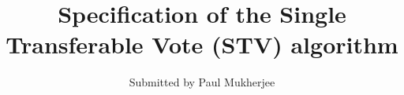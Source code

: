 \documentclass{article}
\begin{document}
\title{Specification of the Single Transferable Vote (STV) algorithm}
\author{Submitted by Paul Mukherjee}
\maketitle

\begin{vdm}

\end{vdm}

\printindex
\end{document}
